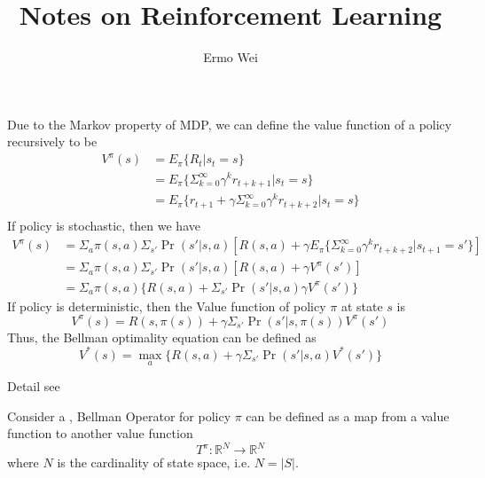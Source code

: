 \documentclass[9pt]{article}
\begin{document}
\title{Notes on Reinforcement Learning}
\author{Ermo Wei}
\date{}

\maketitle

\tableofcontents
\hypersetup{colorlinks=blue}

\clearpage 



 \Working

 Due to the Markov property of MDP, we can define the value function of a policy recursively to be 
\begin{displaymath}
  \begin{split}
    V^{\pi}(s) & = E_{\pi}\{R_t|s_t=s\}\\
    & = E_{\pi}\{\Sigma_{k=0}^{\infty}{\gamma^{k}r_{t+k+1}}|s_t = s\}\\
    & = E_{\pi}\{r_{t+1}+\gamma \Sigma_{k=0}^{\infty}{\gamma^{k}r_{t+k+2}}|s_t = s\}\\
  \end{split}
\end{displaymath}
If policy is stochastic, then we have
\begin{displaymath}
  \begin{split}
    V^{\pi}(s) & = \Sigma_{a}\pi(s,a)\Sigma_{s'}\Pr(s'|s,a)[R(s,a)+\gamma E_{\pi}\{\Sigma_{k=0}^{\infty}\gamma^{k}r_{t+k+2}|s_{t+1}=s'\}]\\
    & = \Sigma_{a}\pi(s,a)\Sigma_{s'}\Pr(s'|s,a)[R(s,a)+\gamma V^{\pi}(s')]\\
    & = \Sigma_{a}\pi(s,a)\{R(s,a)+\Sigma_{s'}\Pr(s'|s,a)\gamma V^{\pi}(s')\}
  \end{split}
\end{displaymath}
If policy is deterministic, then the Value function of policy $\pi$ at state $s$ is
\begin{displaymath}
  V^{\pi}(s) = R(s,\pi(s))+\gamma \Sigma_{s'}\Pr(s'|s,\pi(s))V^{\pi}(s')
\end{displaymath}
Thus, the Bellman optimality equation can be defined as
\begin{displaymath}
  V^{*}(s) = \max_a \{R(s,a)+\gamma \Sigma_{s'}\Pr(s'|s,a)V^{*}(s')\}
\end{displaymath}

Detail see \citep{barto1998reinforcement}

 Consider a , Bellman Operator for policy $\pi$ can be defined as a map from a value function to another value function
\begin{displaymath}
  T^\pi:\mathbb{R}^N \rightarrow \mathbb{R}^N
\end{displaymath}
where $N$ is the cardinality of state space, i.e. $N = |S|$.
\end{document}
